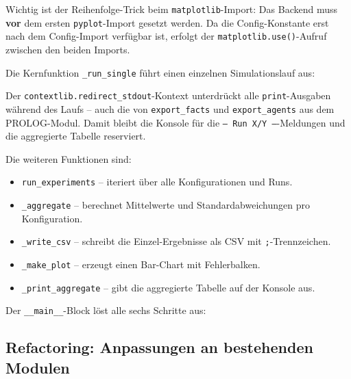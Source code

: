 Wichtig ist der Reihenfolge-Trick beim \texttt{matplotlib}-Import: Das Backend muss \textbf{vor} dem ersten \texttt{pyplot}-Import gesetzt werden. Da die Config-Konstante erst nach dem Config-Import verfügbar ist, erfolgt der \texttt{matplotlib.use()}-Aufruf zwischen den beiden Imports.

Die Kernfunktion \texttt{\_run\_single} führt einen einzelnen Simulationslauf aus:



Der \texttt{contextlib.redirect\_stdout}-Kontext unterdrückt alle \texttt{print}-Ausgaben während des Laufs -- auch die von \texttt{export\_facts} und \texttt{export\_agents} aus dem \acs{PROLOG}-Modul. Damit bleibt die Konsole für die \texttt{--- Run X/Y ---}-Meldungen und die aggregierte Tabelle reserviert.

Die weiteren Funktionen sind:
\begin{itemize}
    \item \texttt{run\_experiments} -- iteriert über alle Konfigurationen und Runs.
    \item \texttt{\_aggregate} -- berechnet Mittelwerte und Standardabweichungen pro Konfiguration.
    \item \texttt{\_write\_csv} -- schreibt die Einzel-Ergebnisse als CSV mit \texttt{;}-Trennzeichen.
    \item \texttt{\_make\_plot} -- erzeugt einen Bar-Chart mit Fehlerbalken.
    \item \texttt{\_print\_aggregate} -- gibt die aggregierte Tabelle auf der Konsole aus.
\end{itemize}

Der \texttt{\_\_main\_\_}-Block löst alle sechs Schritte aus:




\subsection{Refactoring: Anpassungen an bestehenden Modulen}


